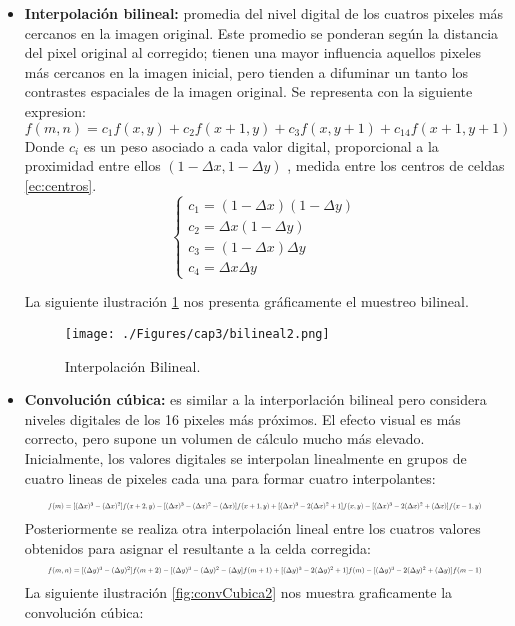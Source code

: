 \begin{itemize}
		\item \textbf{Interpolaci\'on bilineal:} promedia del nivel digital de los cuatros pixeles m\'as cercanos en la imagen original. Este promedio se ponderan seg\'un la distancia del pixel original al corregido; tienen una mayor influencia aquellos pixeles m\'as cercanos en la imagen inicial, pero tienden a difuminar un tanto los contrastes espaciales de la imagen original. Se representa con la siguiente expresion:
		\begin{equation}
		f(m,n) = c_{1}f(x,y)+c_{2}f(x+1,y)+c_{3}f(x,y+1)+c_{14}f(x+1,y+1)
		\end{equation}	
		Donde $ c_{i} $ es un peso asociado a cada valor digital, proporcional a la proximidad entre ellos $ (1-\Delta x, 1-\Delta y) $ , medida entre los centros de celdas \ref{ec:centros}.
		\begin{equation}\label{ec:centros}
		\begin{cases}
		c_{1} = (1-\Delta x)(1-\Delta y)\\
		c_{2} = \Delta x(1-\Delta y)\\
		c_{3} = (1-\Delta x)\Delta y\\
		c_{4} = \Delta x \Delta y
		\end{cases}
		\end{equation}	
		
		La siguiente ilustraci\'on \ref{fig:bilineal2} nos presenta gr\'aficamente el muestreo bilineal.
		    \begin{figure}[H]
		    	\centering
		    	\texttt{[image: ./Figures/cap3/bilineal2.png]}
		    	\caption{Interpolaci\'on Bilineal.}
		    	\label{fig:bilineal2}
		    \end{figure}
		\item \textbf{Convoluci\'on c\'ubica:} es similar a la interporlaci\'on bilineal pero considera niveles digitales de los 16 pixeles m\'as pr\'oximos. El efecto visual es m\'as correcto, pero supone un volumen de c\'alculo mucho m\'as elevado. Inicialmente, los valores digitales se interpolan linealmente en grupos de cuatro lineas de pixeles cada una para formar cuatro interpolantes:
		
		\begin{equation}
		\resizebox{.9 \textwidth}{!} {$
		f(m) = [(\Delta x)^{3}-(\Delta x)^{2}]f(x+2,y)-[(\Delta x)^{3}-(\Delta x)^{2}-(\Delta x)]f(x+1,y)+[(\Delta x)^{3}-2(\Delta x)^{2}+1]f(x,y)-[(\Delta x)^{3}-2(\Delta x)^{2}+(\Delta x)]f(x-1,y)
		$}
		\end{equation}	
		Posteriormente se realiza otra interpolaci\'on lineal entre los cuatros valores obtenidos para asignar el resultante a la celda corregida:
		\begin{equation}\resizebox{.9 \textwidth}{!}{$
		f(m,n) = [(\Delta y)^{3}-(\Delta y)^{2}]f(m+2)-[(\Delta y)^{3}-(\Delta y)^{2}-(\Delta y]f(m+1)+[(\Delta y)^{3}-2(\Delta y)^{2}+1]f(m)-[(\Delta y)^{3}-2(\Delta y)^{2}+(\Delta y)]f(m-1)
		$}
		\end{equation}	
		La siguiente ilustraci\'on \ref{fig:convCubica2} nos muestra graficamente la convoluci\'on c\'ubica:
		

\end{itemize}
